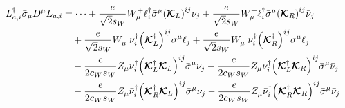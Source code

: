 \documentclass[a4paper,11pt]{article} \pdfoutput=1
\newcommand{\rhn}{\bar{\nu}}
\newcommand{\cK}{\mathcal{K}}
\newcommand{\OmegaVVb}{\bm{\Omega}_{\nu\nu}}
\newcommand{\OmegaVNb}{\bm{\Omega}_{\nu\rhn}}
\newcommand{\OmegaNVb}{\bm{\Omega}_{\rhn\nu}}
\newcommand{\OmegaNNb}{\bm{\Omega}_{\rhn\rhn}}
\begin{document}
\begin{align}
	L^{\dagger}_{a,i}\bar{\sigma}_{\mu}D^{\mu}L_{a,i}
	 & = \cdots
	+\frac{e}{\sqrt{2}s_{W}}W^{+}_{\mu}\ell_{i}^{\dagger}\bar{\sigma}^{\mu}\qty(\bm{\cK}_{L})^{ij}\nu_{j}
	+\frac{e}{\sqrt{2}s_{W}}W^{+}_{\mu}\ell_{i}^{\dagger}\bar{\sigma}^{\mu}\qty(\bm{\cK}_{R})^{ij}\rhn_{j}\notag                \\
	 & \quad
	+\frac{e}{\sqrt{2}s_{W}}W^{-}_{\mu}\nu_{i}^{\dagger}\qty(\bm{\cK}_{L}^{\dagger})^{ij}\bar{\sigma}^{\mu}\ell_{j}
	+\frac{e}{\sqrt{2}s_{W}}W^{-}_{\mu}\rhn_{i}^{\dagger}\qty(\bm{\cK}_{R}^{\dagger})^{ij}\bar{\sigma}^{\mu}\ell_{j}\notag      \\
	 & \quad
	-\frac{e}{2c_{W}s_{W}}Z_{\mu}\nu_{i}^{\dagger}\qty(\bm{\cK}_{L}^{\dagger}\bm{\cK}_{L})^{ij}\bar{\sigma}^{\mu}\nu_{j}
	-\frac{e}{2c_{W}s_{W}}Z_{\mu}\nu_{i}^{\dagger}\qty(\bm{\cK}_{L}^{\dagger}\bm{\cK}_{R})^{ij}\bar{\sigma}^{\mu}\rhn_{j}\notag \\
	 & \quad
	-\frac{e}{2c_{W}s_{W}}Z_{\mu}\rhn_{i}^{\dagger}\qty(\bm{\cK}_{R}^{\dagger}\bm{\cK}_{L})^{ij}\bar{\sigma}^{\mu}\nu_{j}
	-\frac{e}{2c_{W}s_{W}}Z_{\mu}\rhn_{i}^{\dagger}\qty(\bm{\cK}_{R}^{\dagger}\bm{\cK}_{R})^{ij}\bar{\sigma}^{\mu}\rhn_{j}\notag
\end{align}
\end{document}
